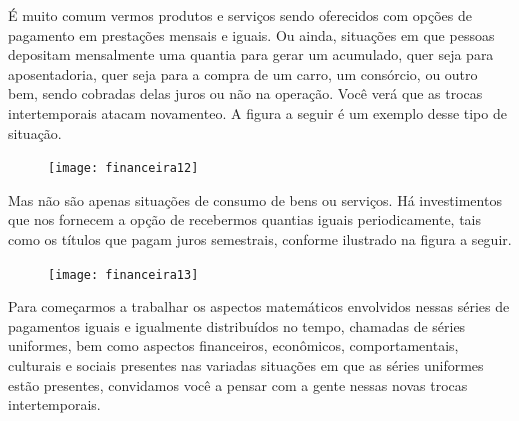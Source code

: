 
É muito comum vermos produtos e serviços sendo oferecidos com opções de pagamento em prestações mensais e iguais. Ou ainda, situações em que pessoas depositam mensalmente uma quantia para gerar um acumulado, quer seja para aposentadoria, quer seja para a compra de um carro, um consórcio, ou outro bem, sendo cobradas delas juros ou não na operação. Você verá que as trocas intertemporais atacam novamenteo. A figura a seguir é um exemplo desse tipo de situação.

\begin{figure}[H]
\centering

\texttt{[image: financeira12]}
\end{figure}

Mas não são apenas situações de consumo de bens ou serviços. Há investimentos que nos fornecem a opção de recebermos quantias iguais periodicamente, tais como os títulos que pagam juros semestrais, conforme ilustrado na figura a seguir.

\begin{figure}[H]
\centering

\texttt{[image: financeira13]}
\end{figure}

Para começarmos a trabalhar os aspectos matemáticos envolvidos nessas séries de pagamentos iguais e igualmente distribuídos no tempo, chamadas de séries uniformes, bem como aspectos financeiros, econômicos, comportamentais, culturais e sociais presentes nas variadas situações em que as séries uniformes estão presentes, convidamos você a pensar com a gente nessas novas trocas intertemporais.

